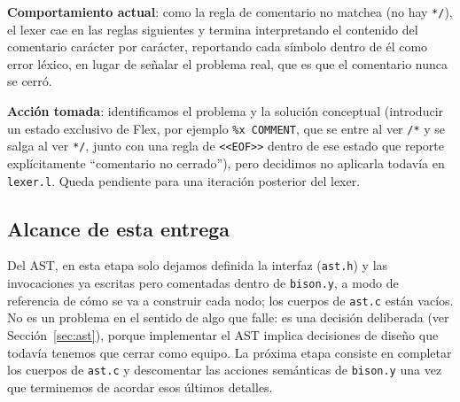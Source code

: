 \documentclass[11pt,a4paper]{article}
\begin{document}
\textbf{Comportamiento actual}: como la regla de comentario no matchea (no
hay \texttt{*/}), el lexer cae en las reglas siguientes y termina
interpretando el contenido del comentario carácter por carácter, reportando
cada símbolo dentro de él como error léxico, en lugar de señalar el problema
real, que es que el comentario nunca se cerró.

\textbf{Acción tomada}: identificamos el problema y la solución conceptual
(introducir un estado exclusivo de Flex, por ejemplo \texttt{\%x COMMENT},
que se entre al ver \texttt{/*} y se salga al ver \texttt{*/}, junto con una
regla de \texttt{<<EOF>>} dentro de ese estado que reporte explícitamente
``comentario no cerrado''), pero decidimos no aplicarla todavía en
\texttt{lexer.l}. Queda pendiente para una iteración posterior del lexer.

\subsection{Alcance de esta entrega}

Del AST, en esta etapa solo dejamos definida la interfaz (\texttt{ast.h}) y
las invocaciones ya escritas pero comentadas dentro de \texttt{bison.y}, a
modo de referencia de cómo se va a construir cada nodo; los cuerpos de
\texttt{ast.c} están vacíos. No es un problema en el sentido de algo que
falle: es una decisión deliberada (ver Sección~\ref{sec:ast}), porque
implementar el AST implica decisiones de diseño que todavía tenemos que
cerrar como equipo. La próxima etapa consiste en completar los cuerpos de
\texttt{ast.c} y descomentar las acciones semánticas de \texttt{bison.y} una
vez que terminemos de acordar esos últimos detalles.
\end{document}

